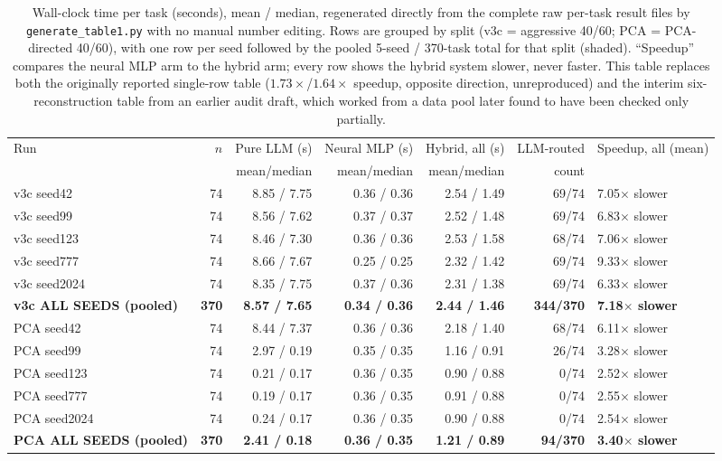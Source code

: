 \documentclass[twoside,11pt]{article}
\begin{document}
\begin{table}[htbp]
\centering
\small
\caption{Wall-clock time per task (seconds), mean / median, regenerated
directly from the complete raw per-task result files by
\texttt{generate\_table1.py} with no manual number editing. Rows are
grouped by split (v3c = aggressive 40/60; PCA = PCA-directed 40/60), with
one row per seed followed by the pooled 5-seed / 370-task total for that
split (shaded). ``Speedup'' compares the neural MLP arm to the hybrid
arm; every row shows the hybrid system slower, never faster. This table
replaces both the originally reported single-row table
($1.73\times$/$1.64\times$ speedup, opposite direction, unreproduced) and
the interim six-reconstruction table from an earlier audit draft, which
worked from a data pool later found to have been checked only partially.}
\label{tab:timing_full}
\begin{tabular}{lrrrrrl}
\toprule
Run & $n$ & Pure LLM (s) & Neural MLP (s) & Hybrid, all (s) & LLM-routed & Speedup, all (mean) \\
    &     & mean/median  & mean/median    & mean/median      & count      &  \\
\midrule
v3c seed42  & 74 & 8.85 / 7.75 & 0.36 / 0.36 & 2.54 / 1.49 & 69/74 & 7.05$\times$ slower \\
v3c seed99  & 74 & 8.56 / 7.62 & 0.37 / 0.37 & 2.52 / 1.48 & 69/74 & 6.83$\times$ slower \\
v3c seed123 & 74 & 8.46 / 7.30 & 0.36 / 0.36 & 2.53 / 1.58 & 68/74 & 7.06$\times$ slower \\
v3c seed777 & 74 & 8.66 / 7.67 & 0.25 / 0.25 & 2.32 / 1.42 & 69/74 & 9.33$\times$ slower \\
v3c seed2024 & 74 & 8.35 / 7.75 & 0.37 / 0.36 & 2.31 / 1.38 & 69/74 & 6.33$\times$ slower \\
\rowcolor{black!8}
\textbf{v3c ALL SEEDS (pooled)} & \textbf{370} & \textbf{8.57 / 7.65} & \textbf{0.34 / 0.36} & \textbf{2.44 / 1.46} & \textbf{344/370} & \textbf{7.18$\times$ slower} \\
PCA seed42  & 74 & 8.44 / 7.37 & 0.36 / 0.36 & 2.18 / 1.40 & 68/74 & 6.11$\times$ slower \\
PCA seed99  & 74 & 2.97 / 0.19 & 0.35 / 0.35 & 1.16 / 0.91 & 26/74 & 3.28$\times$ slower \\
PCA seed123 & 74 & 0.21 / 0.17 & 0.36 / 0.35 & 0.90 / 0.88 & 0/74  & 2.52$\times$ slower \\
PCA seed777 & 74 & 0.19 / 0.17 & 0.36 / 0.35 & 0.91 / 0.88 & 0/74  & 2.55$\times$ slower \\
PCA seed2024 & 74 & 0.24 / 0.17 & 0.36 / 0.35 & 0.90 / 0.88 & 0/74 & 2.54$\times$ slower \\
\rowcolor{black!8}
\textbf{PCA ALL SEEDS (pooled)} & \textbf{370} & \textbf{2.41 / 0.18} & \textbf{0.36 / 0.35} & \textbf{1.21 / 0.89} & \textbf{94/370} & \textbf{3.40$\times$ slower} \\
\bottomrule
\end{tabular}
\end{table}
\end{document}
